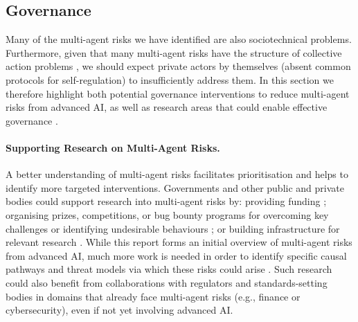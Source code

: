 \subsection{Governance}
\label{sec:governance}

Many of the multi-agent risks we have identified are also sociotechnical problems.
Furthermore, given that many multi-agent risks have the structure of collective action problems \citep{gavrilets2015collective, Ostrom1990}, we should expect private actors by themselves (absent common protocols for self-regulation) to insufficiently address them. 
In this section we therefore highlight both potential governance interventions to reduce multi-agent risks from advanced AI, as well as research areas that could enable effective governance \citep[see also recent overviews from][]{reuel2024open,Lazar2023,Curtis2024,Weidinger2023a,Kolt2025}.

\paragraph{Supporting Research on Multi-Agent Risks.}
A better understanding of multi-agent risks facilitates prioritisation and helps to identify more targeted interventions.
Governments and other public and private bodies could support research into multi-agent risks by:
providing funding \citep{NSF2023,CAIF2025,ARIA2024};
organising prizes, competitions, or bug bounty programs for overcoming key challenges or identifying undesirable behaviours \citep{CAIS2024,zhao_devising_2017,Levermore2023}; 
or building infrastructure for relevant research \citep{national_artificial_intelligence_research_resource_task_force_strengthening_2023,ASI2024}. 
While this report forms an initial overview of multi-agent risks from advanced AI, much more work is needed in order to identify specific causal pathways and threat models via which these risks could arise \citep{shelby_sociotechnical_2023,rismani_plane_2023,koessler_risk_2023, dai2025individualexperiencecollectiveevidence}.
Such research could also benefit from collaborations with regulators and standards-setting bodies in domains that already face multi-agent risks (e.g., finance or cybersecurity), even if not yet involving advanced AI.

